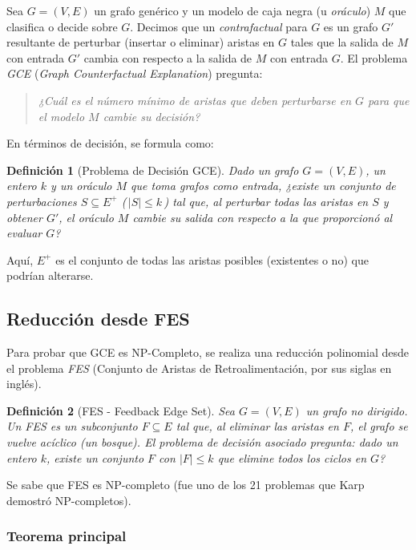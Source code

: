 \documentclass[a4paper]{article}
\newtheorem{definition}{Definición}
\begin{document}
Sea $G = (V, E)$ un grafo genérico y un modelo de caja negra (u \emph{oráculo}) $M$ que clasifica o decide sobre $G$. 
Decimos que un \emph{contrafactual} para $G$ es un grafo $G'$ resultante de perturbar (insertar o eliminar) aristas en $G$ tales que la salida de $M$ con entrada $G'$ cambia con respecto a la salida de $M$ con entrada $G$.  
El problema \emph{GCE} (\emph{Graph Counterfactual Explanation}) pregunta: 

\begin{quote}
    \emph{¿Cuál es el número mínimo de aristas que deben perturbarse en $G$ para que el modelo $M$ cambie su decisión?}
\end{quote}

En términos de decisión, se formula como:

\begin{definition}[Problema de Decisión GCE]
Dado un grafo $G=(V,E)$, un entero $k$ y un oráculo $M$ que toma grafos como entrada,  
¿existe un conjunto de perturbaciones $S \subseteq E^+$
(\,$|S| \leq k$\,) 
tal que, al perturbar todas las aristas en $S$ y obtener $G'$, 
el oráculo $M$ cambie su salida con respecto a la que proporcionó al evaluar $G$?
\end{definition}

Aquí, $E^+$ es el conjunto de todas las aristas posibles (existentes o no) que podrían alterarse.

\subsection{Reducción desde FES}

Para probar que GCE es NP-Completo, se realiza una reducción polinomial desde el problema \emph{FES} (Conjunto de Aristas de Retroalimentación, por sus siglas en inglés). 

\begin{definition}[FES - Feedback Edge Set]
Sea $G=(V,E)$ un grafo no dirigido. 
Un \emph{FES} es un subconjunto $F \subseteq E$ tal que, al eliminar las aristas en $F$, el grafo se vuelve acíclico (un bosque).  
El problema de decisión asociado pregunta: \emph{dado un entero $k$, existe un conjunto $F$ con $|F|\leq k$ que elimine todos los ciclos en $G$?}
\end{definition}

Se sabe que FES es NP-completo (fue uno de los 21 problemas que Karp demostró NP-completos).

\subsubsection*{Teorema principal}
\end{document}
